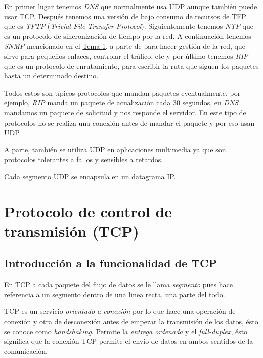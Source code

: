 \documentclass[10pt,a4paper,spanish]{report}
\begin{document}
En primer lugar tenemos \textcolor{tema3}{\textit{DNS}} que normalmente usa UDP aunque también puede usar TCP. Después tenemos una versión de bajo consumo de recursos de TFP que es \textit{\textcolor{tema3}{TFTP}} (\textit{\textcolor{tema3}{Trivial File Transfer Protocol}}). Siguientemente tenemos \textcolor{tema3}{\textit{NTP}} que es un protocolo de sincronización de tiempo por la red. A continuación tenemos \textit{\textcolor{tema3}{SNMP}} mencionado en el \hyperref[protocolosnmp]{Tema 1}, a parte de  para hacer gestión de la red, que sirve para pequeños enlaces, controlar el tráfico, etc y por último tenemos \textcolor{tema3}{\textit{RIP}} que es un protocolo de enrutamiento, para escribir la ruta que siguen los paquetes hasta un determinado destino.

Todos estos son típicos protocolos que mandan paquetes eventualmente, por ejemplo, \textcolor{tema3}{\textit{RIP}} manda un paquete de acualización cada 30 segundos, en \textcolor{tema3}{\textit{DNS}} mandamos un paquete de solicitud y nos responde el servidor. En este tipo de protocolos no se realiza una conexión antes de mandar el paquete y por eso usan UDP. 

A parte, también se utiliza UDP en aplicaciones multimedia ya que son protocolos tolerantes a fallos y sensibles a retardos.

Cada segmento UDP se encapsula en un datagrama IP.

\section{\textcolor{tema3}Protocolo de control de transmisión (TCP)}
\subsection{\textcolor{tema3}Introducción a la funcionalidad de TCP}
En TCP a cada paquete del flujo de datos se le llama \textcolor{tema3}{\textit{segmento}} pues hace referencia a un segmento dentro de una linea recta, una parte del todo.

TCP es un servicio \textcolor{tema3}{\textit{orientado a conexión}} por lo que hace una operación de conexión y otra de desconexión antes de empezar la transmisión de los datos, ésto se conoce como \textit{\textcolor{tema3}{handshaking}}. Permite la \textit{\textcolor{tema3}{entrega ordenada}} y el \textcolor{tema3}{\textit{full-duplex}}, ésto significa que la conexión TCP permite el envío de datos en ambos sentidos de la comunicación. 
\end{document}

